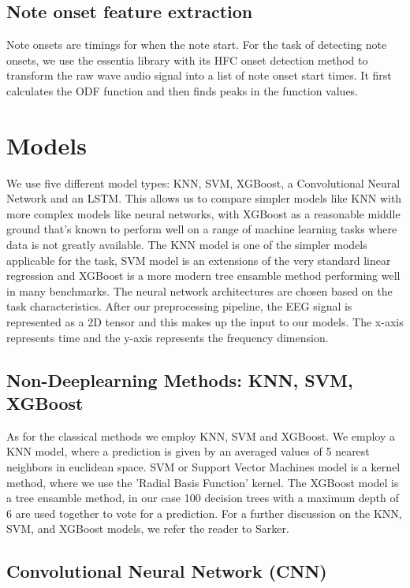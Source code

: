 \subsection{Note onset feature extraction}
\label{sec:note-onset}

Note onsets are timings for when the note start. 
For the task of detecting note onsets, we use the essentia\cite{essentia} library with its HFC onset detection method to transform the raw wave audio signal into a list of note onset start times.
It first calculates the ODF function and then finds peaks in the function values.

\section{Models}

We use five different model types: KNN, SVM, XGBoost, a Convolutional Neural Network and an LSTM.
This allows us to compare simpler models like KNN with more complex models like neural networks, with XGBoost as a reasonable middle ground that's known to perform well on a range of machine learning tasks where data is not greatly available.
The KNN model is one of the simpler models applicable for the task, SVM model is an extensions of the very standard linear regression and XGBoost is a more modern tree ensamble method performing well in many benchmarks.
The neural network architectures are chosen based on the task characteristics.
After our preprocessing pipeline, the EEG signal is represented as a 2D tensor and this makes up the input to our models. 
The x-axis represents time and the y-axis represents the frequency dimension.

\subsection{Non-Deeplearning Methods: KNN, SVM, XGBoost}

As for the classical methods we employ KNN, SVM and XGBoost.
We employ a KNN model, where a prediction is given by an averaged values of 5 nearest neighbors in euclidean space.
SVM or Support Vector Machines model is a kernel method, where we use the 'Radial Basis Function' kernel.
The XGBoost model is a tree ensamble method, in our case 100 decision trees with a maximum depth of 6 are used together to vote for a prediction.
For a further discussion on the KNN, SVM, and XGBoost models, we refer the reader to Sarker\cite{sarker}\cite{sarker2}.

\subsection{Convolutional Neural Network (CNN)}

